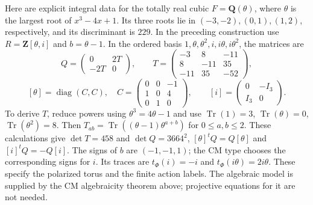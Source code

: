 \documentclass[11pt]{article}
\theoremstyle{definition}\newtheorem{definition}[theorem]{Definition}
\theoremstyle{remark}\newtheorem{remark}[theorem]{Remark}
\newcommand{\Q}{\mathbf Q}\newcommand{\Z}{\mathbf Z}
\begin{document}
Here are explicit integral data for the totally real cubic
$F=\Q(\theta)$, where $\theta$ is the largest root of $x^3-4x+1$.
Its three roots lie in $(-3,-2),(0,1),(1,2)$, respectively, and its
discriminant is $229$. In the preceding construction use
$R=\Z[\theta,i]$ and $b=\theta-1$. In the ordered basis
$1,\theta,\theta^2,i,i\theta,i\theta^2$, the matrices are
\[
 Q=\begin{pmatrix}0&2T\\-2T&0\end{pmatrix},\qquad
 T=\begin{pmatrix}-3&8&-11\\8&-11&35\\-11&35&-52\end{pmatrix},
\]
\[
 [\theta]=\operatorname{diag}(C,C),\quad
 C=\begin{pmatrix}0&0&-1\\1&0&4\\0&1&0\end{pmatrix},\qquad
 [i]=\begin{pmatrix}0&-I_3\\I_3&0\end{pmatrix}.
\]
To derive $T$, reduce powers using $\theta^3=4\theta-1$ and use
$\operatorname{Tr}(1)=3$, $\operatorname{Tr}(\theta)=0$,
$\operatorname{Tr}(\theta^2)=8$. Then
$T_{ab}=\operatorname{Tr}((\theta-1)\theta^{a+b})$ for $0\le a,b\le2$.
These calculations give $\det T=458$ and $\det Q=3664^2$,
$[\theta]^tQ=Q[\theta]$ and $[i]^tQ=-Q[i]$.
The signs of $b$ are $(-1,-1,1)$; the CM type chooses the corresponding
signs for $i$. Its traces are $t_\Phi(i)=-i$ and
$t_\Phi(i\theta)=2i\theta$. These specify the polarized torus and the
finite action labels. The algebraic model is supplied by the CM
algebraicity theorem above; projective equations for it are not needed.
\end{document}
